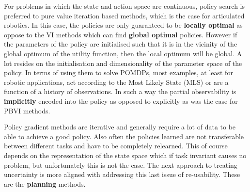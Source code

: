 For problems in which the state and action space are continuous, policy search is preferred to pure value iteration based methods, 
which is the case for articulated robotics. In this case, the policies are only guaranteed to be \textbf{locally optimal} as oppose 
to the VI methods which can find \textbf{global optimal} policies. However if the parameters of the policy are initialised 
such that it is in the vicinity of the global optimum of the utility function, then the local optimum will be global. 
A lot resides on the initialisation and dimensionality of the parameter space of the policy. 
In terms of using them to solve POMDPs, most examples, at least for robotic applications, act according to the Most Likely State (MLS) or 
are a function of a history of observations. In such a way the partial observability is \textbf{implicitly} encoded into the policy as 
opposed to explicitly as was the case for PBVI methods. 

Policy gradient methods are iterative and generally require a lot of data to be able to achieve a good policy. Also 
often the policies learned are not transferable between different tasks and have to be completely 
relearned. This of course depends on the representation of the state space which if task invariant causes no problem,
but unfortunately this is not the case. The next approach to treating uncertainty is more aligned with addressing this last issue 
of re-usability. These are the \textbf{planning} methods.



